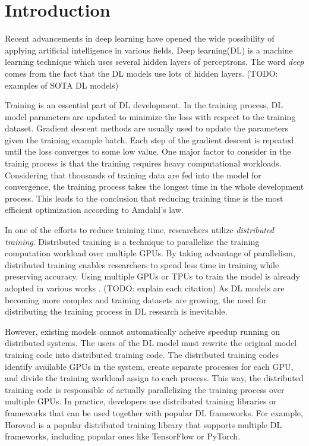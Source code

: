 \section{Introduction}\label{sec:intro}

Recent advancements in deep learning have opened the wide possibility of
applying artificial intelligence in various fields.
Deep learning(DL) is a machine learning technique which uses
several hidden layers of perceptrons.
The word \textit{deep} comes from the fact that the DL models use
lots of hidden layers.
(TODO: examples of SOTA DL models)

Training is an essential part of DL development.
In the training process, DL model parameters are updated to
minimize the loss with respect to the training dataset.
Gradient descent methods are usually used to update the
parameters given the training example batch.
Each step of the gradient descent is repeated until
the loss converges to some low value.
One major factor to consider in the trainig process is that
the training requires heavy computational workloads.
Considering that thousands of training data are fed into the model
for convergence, the training process takes the longest time
in the whole development process. This leads to the conclusion that
reducing training time is the most efficient optimization according to
Amdahl's law.

In one of the efforts to reduce training time, 
researchers utilize \textit{distributed training}.
Distributed training is a technique to parallelize the training computation
workload over multiple GPUs.
By taking advantage of parallelism, distributed training enables researchers
to spend less time in training while preserving accuracy.
Using multiple GPUs or TPUs to train the model is already adopted
in various works \cite{brown2020gpt-3} \cite{silver2017alphazero}
\cite{zhang2019distrspeech} \cite{tian2020distrwebattack}.
(TODO: explain each citation)
As DL models are becoming more complex and training datasets are growing,
the need for distributing the training process in DL research is inevitable.

However, existing models cannot automatically acheive speedup
running on distributed systems.
The users of the DL model must rewrite the original model training
code into distributed training code. 
The distributed training codes identify available GPUs in the system,
create separate processes for each GPU, and divide the training
workload assign to each process.
This way, the distributed training code is responsible of
actually parallelizing the training process over multiple GPUs.
In practice, developers use distributed training libraries or frameworks
that can be used together with popular DL frameworks.  
For example, Horovod\cite{sergeev2018horovod} is a popular
distributed training library that supports multiple DL frameworks,
including popular ones like TensorFlow\cite{tensorflow} 
or PyTorch\cite{pytorch2019}.

